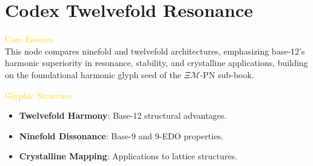 
\section{Codex Twelvefold Resonance}
\label{sec:codex_twelvefold_resonance}



\textcolor{gold}{ Core Essence } \\
This node compares ninefold and twelvefold architectures, emphasizing base-12’s harmonic superiority in resonance, stability, and crystalline applications, building on the foundational harmonic glyph seed of the \(\Xi\mathcal{M}\)-PN sub-book.

\textcolor{gold}{ Glyphic Structure } \\
\begin{itemize}
    \item \texttt{} \textbf{Twelvefold Harmony}: Base-12 structural advantages.
    \item \texttt{} \textbf{Ninefold Dissonance}: Base-9 and 9-EDO properties.
    \item \texttt{} \textbf{Crystalline Mapping}: Applications to lattice structures.
\end{itemize}

